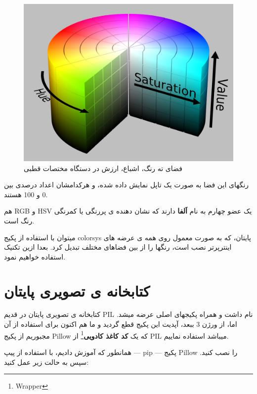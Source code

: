 \documentclass[14pt,a4paper]{memoir}
\begin{document}
 \begin{figure}[H]
 	\centering
 	\includegraphics[scale=0.3]{HSVModel}
 	\caption{فضای ته رنگ، اشباع، ارزش در دستگاه مختصات قطبی }
 \end{figure}

رنگهای این فضا به صورت یک تاپل  نمایش داده شده، و هرکدامشان اعداد درصدی بین 0 و 100 هستند. 

هم RGB و HSV یک عضو چهارم به نام \textbf{اَلفا} دارند که نشان دهنده ی پررنگی  یا کمرنگی رنگ است.


میتوان با استفاده از پکیج colorsys پایتان، که به صورت معمول روی همه ی عرضه های اینترپرتر نصب است، رنگها را از بین فضاهای مختلف تبدیل کرد. بعدا ازین تکنیک استفاده خواهیم نمود.





\section{کتابخانه ی تصویری پایتان}
	
	کتابخانه ی تصویری پایتان در قدیم PIL نام داشت و همراه پکیجهای اصلی عرضه میشد. اما، از ورژن 3 ببعد، آپدیت این پکیج قطع گردید و ما هم اکنون برای استفاده از آن مجبوریم از پکیج Pillow که یک \textbf{کد کاغذ کادویی}\footnote{Wrapper} از PIL میباشد استفاده نماییم.
	
	همانطور که آموزش دادیم، با استفاده از پیپ --- pip --- پکیج Pillow را نصب کنید. سپس به حالت زیر عمل کنید:
	
	
	
	
		 	 	 	 \begin{latin}
		
	\end{latin}
	
\end{document}
